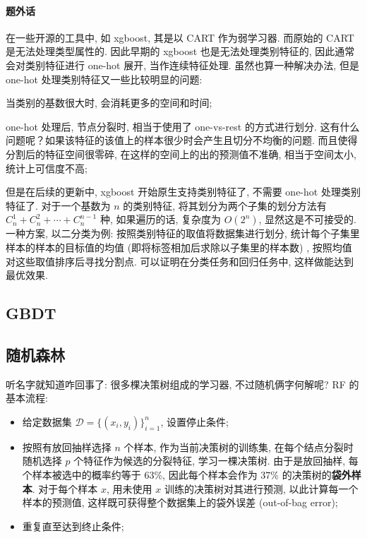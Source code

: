 \paragraph{题外话}
在一些开源的工具中, 如 xgboost, 其是以 CART 作为弱学习器. 而原始的 CART 是无法处理类型属性的. 因此早期的 xgboost 也是无法处理类别特征的, 因此通常会对类别特征进行 one-hot 展开, 当作连续特征处理. 虽然也算一种解决办法, 但是 one-hot 处理类别特征又一些比较明显的问题: 
\begin{myitemize}
	\item 当类别的基数很大时, 会消耗更多的空间和时间; 
	
	\item one-hot 处理后, 节点分裂时, 相当于使用了 one-vs-rest 的方式进行划分. 这有什么问题呢？如果该特征的该值上的样本很少时会产生且切分不均衡的问题. 而且使得分割后的特征空间很零碎, 在这样的空间上的出的预测值不准确, 相当于空间太小, 统计上可信度不高; 
\end{myitemize}

但是在后续的更新中, xgboost 开始原生支持类别特征了, 不需要 one-hot 处理类别特征了. 对于一个基数为 $n$ 的类别特征, 将其划分为两个子集的划分方法有 $C_n^1 + C_n^2 + \cdots +C_n^{n-1}$ 种, 如果遍历的话, 复杂度为 $O(2^n)$, 显然这是不可接受的. 一种方案, 以二分类为例: 按照类别特征的取值将数据集进行划分, 统计每个子集里样本的样本的目标值的均值 (即将标签相加后求除以子集里的样本数) , 按照均值对这些取值排序后寻找分割点. 可以证明在分类任务和回归任务中, 这样做能达到最优效果. 

\subsection{GBDT}

\subsection{随机森林}
听名字就知道咋回事了: 很多棵决策树组成的学习器, 不过随机俩字何解呢? RF 的基本流程:
\begin{itemize}
	\item 给定数据集 $\mathcal{D}  = \{(x_i, y_i)\}_{i=1}^n$, 设置停止条件;
	
	\item 按照有放回抽样选择 $n$ 个样本, 作为当前决策树的训练集, 在每个结点分裂时随机选择 $p$ 个特征作为候选的分裂特征, 学习一棵决策树. 由于是放回抽样, 每个样本被选中的概率约等于 63\%, 因此每个样本会作为 37\% 的决策树的\textbf{袋外样本}. 对于每个样本 $x$, 用未使用 $x$ 训练的决策树对其进行预测, 以此计算每一个样本的预测值, 这样既可获得整个数据集上的袋外误差 (out-of-bag error);
	
	\item 重复直至达到终止条件;
\end{itemize}

